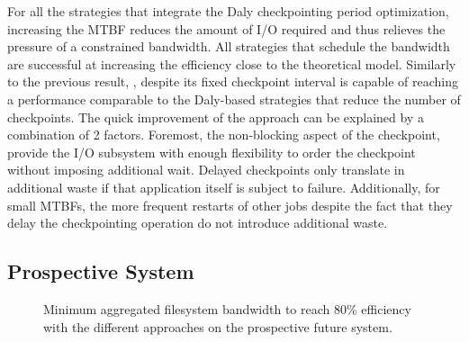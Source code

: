 For all the strategies that integrate the Daly checkpointing period
optimization, increasing the MTBF reduces the amount of I/O required
and thus relieves the pressure of a constrained bandwidth. All
strategies that schedule the bandwidth are successful at increasing the
efficiency close to the theoretical model.
%
Similarly to the previous result, \fifofixed, despite its fixed checkpoint
interval is capable of reaching a performance comparable to the Daly-based
strategies that reduce the number of checkpoints. The quick improvement of the
\fifofixed approach can be explained by a combination of 2 factors. Foremost,
the non-blocking aspect of the checkpoint, provide the I/O subsystem with enough
flexibility to order the checkpoint without imposing additional wait. Delayed
checkpoints only translate in additional waste if that application itself is
subject to failure. Additionally, for small MTBFs, the more frequent restarts of
other jobs despite the fact that they delay the checkpointing operation do not
introduce additional waste.


\subsection{Prospective System}

\begin{figure}
  \begin{center}
    \resizebox{\linewidth}{!}{}
  \end{center}
  \caption{Minimum aggregated filesystem bandwidth to reach 80\%
    efficiency with the different approaches on the prospective
    future system.\label{fig:prosp}}
\end{figure}

